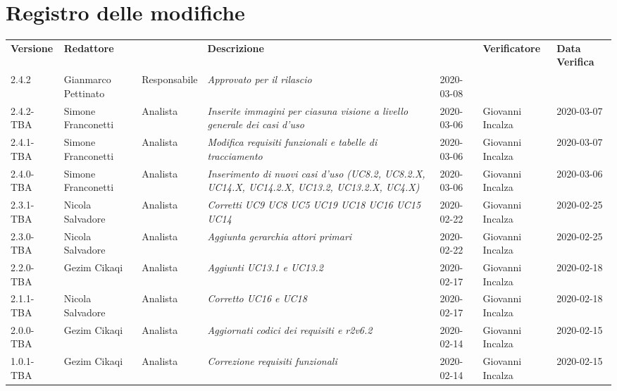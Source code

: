 \section*{Registro delle modifiche}
\renewcommand{\arraystretch}{1.8}
  \setlength\LTleft{-1.7cm}
  \begin{longtable}{|p{1.7cm}|p{2cm}|p{2.5cm}|p{3cm}|p{1.7cm}|p{2cm}|p{2.3cm}|}
    \hline
    \rowcolor{header}
    \textbf{Versione} & \textbf{Redattore} & \centering{\textbf{Ruolo}} & \textbf{Descrizione} &      \centering{\textbf{Data}} & \textbf{Verificatore} & \textbf{Data Verifica} \\
    2.4.2 & Gianmarco Pettinato & Responsabile & \small{\textit{Approvato per il rilascio}} & 2020-03-08 & &\\
    2.4.2-TBA & Simone Franconetti & Analista & \small{\textit{Inserite immagini per ciasuna visione a livello generale dei casi d'uso}} & 2020-03-06 & Giovanni Incalza & 2020-03-07 \\
    2.4.1-TBA & Simone Franconetti & Analista & \small{\textit{Modifica requisiti funzionali e tabelle di tracciamento}} & 2020-03-06 & Giovanni Incalza & 2020-03-07 \\
    2.4.0-TBA & Simone Franconetti & Analista & \small{\textit{Inserimento di nuovi casi d'uso (UC8.2, UC8.2.X, UC14.X, UC14.2.X, UC13.2, UC13.2.X, UC4.X)}} & 2020-03-06 & Giovanni Incalza & 2020-03-06 \\
    2.3.1-TBA & Nicola Salvadore & Analista & \small{\textit{Corretti UC9 UC8 UC5 UC19 UC18 UC16 UC15 UC14}} & 2020-02-22 & Giovanni Incalza & 2020-02-25 \\
    2.3.0-TBA & Nicola Salvadore & Analista & \small{\textit{Aggiunta gerarchia attori primari}} & 2020-02-22 & Giovanni Incalza & 2020-02-25 \\
    2.2.0-TBA & Gezim Cikaqi & Analista & \small{\textit{Aggiunti UC13.1 e UC13.2}} & 2020-02-17 & Giovanni Incalza & 2020-02-18 \\
    2.1.1-TBA & Nicola Salvadore & Analista & \small{\textit{Corretto UC16 e UC18}} & 2020-02-17 & Giovanni Incalza & 2020-02-18 \\
    2.0.0-TBA & Gezim Cikaqi & Analista & \small{\textit{Aggiornati codici dei requisiti e r2v6.2}} & 2020-02-14 & Giovanni Incalza & 2020-02-15 \\
    1.0.1-TBA & Gezim Cikaqi & Analista & \small{\textit{Correzione requisiti funzionali}} & 2020-02-14 & Giovanni Incalza & 2020-02-15 \\

\end{longtable}
